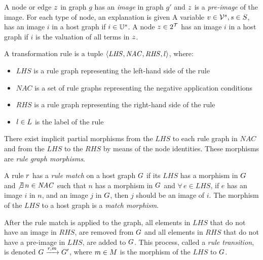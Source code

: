 \begin{definition}
A node or edge $z$ in graph $g$ has an \textit{image} in graph $g'$ and $z$ is a \textit{pre-image} of the image. For each type of node, an explanation is given  A variable $v \in \mathcal{V}^{s}, s \in S$, has an image $i$ in a host graph if $i \in \mathbb{U}^{s}$. A node $z \in 2^{\mathcal{T}}$ has an image $i$ in a host graph if $i$ is the valuation of all terms in $z$. 
\end{definition}

\vspace{5px}
\begin{definition}
A transformation rule is a tuple $\langle \mathit{LHS}, \mathit{NAC}, \mathit{RHS}, l \rangle$, where:
\begin{itemize}
  \item $\mathit{LHS}$ is a rule graph representing the left-hand side of the rule
  \item $\mathit{NAC}$ is a set of rule graphs representing the negative application conditions
  \item $\mathit{RHS}$ is a rule graph representing the right-hand side of the rule
  \item $l \in L$ is the label of the rule
\end{itemize}
There exist implicit partial morphisms from the $\mathit{LHS}$ to each rule graph in $\mathit{NAC}$ and from the $\mathit{LHS}$ to the $\mathit{RHS}$ by means of the node identities. These morphisms are \textit{rule graph morphisms}.
\end{definition}
\vspace{5px}

\begin{definition}
A rule $r$ has a \textit{rule match} on a host graph $G$ if its $\mathit{LHS}$ has a morphism in $G$ and $\not\exists\,n \in \mathit{NAC}$ such that $n$ has a morphism in $G$ and $\forall\,e \in \mathit{LHS}$, if $e$ has an image $i$ in $n$, and an image $j$ in $G$, then $j$ should be an image of $i$. The morphism of the $\mathit{LHS}$ to a host graph is a \textit{match morphism}.
\end{definition}

\vspace{5px}
\begin{definition}
After the rule match is applied to the graph, all elements in $\mathit{LHS}$ that do not have an image in $\mathit{RHS}$, are removed from $G$ and all elements in $\mathit{RHS}$ that do not have a pre-image in $\mathit{LHS}$, are added to $G$. This process, called a \textit{rule transition}, is denoted $G \xrightarrow{r, m}G'$, where $m \in M$ is the morphism of the $\mathit{LHS}$ to $G$.
\end{definition}
\vspace{5px}

